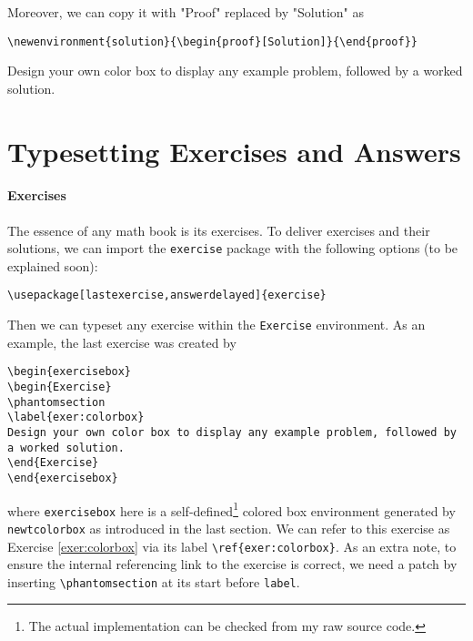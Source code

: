 Moreover, we can copy it with "Proof" replaced by "Solution" as 
\begin{lstlisting}
\newenvironment{solution}{\begin{proof}[Solution]}{\end{proof}}
\end{lstlisting}

\begin{exercisebox}
\begin{Exercise}
\label{exer:colorbox}
Design your own color box to display any example problem, followed by a worked solution.
\end{Exercise}
\end{exercisebox}

\section{Typesetting Exercises and Answers}

\paragraph{Exercises}
The essence of any math book is its exercises. To deliver exercises and their solutions, we can import the \texttt{exercise} package with the following options (to be explained soon):
\begin{lstlisting}
\usepackage[lastexercise,answerdelayed]{exercise}
\end{lstlisting}
Then we can typeset any exercise within the \texttt{Exercise} environment. As an example, the last exercise was created by
\begin{lstlisting}
\begin{exercisebox}
\begin{Exercise}
\phantomsection
\label{exer:colorbox}
Design your own color box to display any example problem, followed by a worked solution.
\end{Exercise}
\end{exercisebox}
\end{lstlisting}
where \texttt{exercisebox} here is a self-defined\footnote{The actual implementation can be checked from my raw source code.} colored box environment generated by \texttt{newtcolorbox} as introduced in the last section. We can refer to this exercise as Exercise \ref{exer:colorbox} via its label \texttt{\textbackslash ref\{exer:colorbox\}}. As an extra note, to ensure the internal referencing link to the exercise is correct, we need a patch by inserting \texttt{\textbackslash phantomsection} at its start before \texttt{label}.

